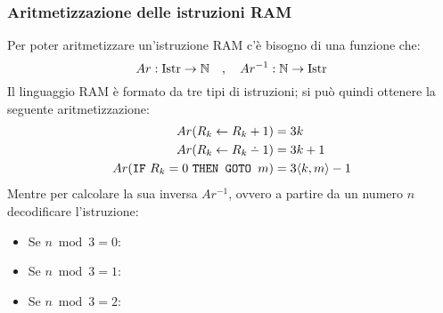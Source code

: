 \subsubsection*{Aritmetizzazione delle istruzioni RAM}
Per poter aritmetizzare un'istruzione RAM c'è bisogno di una funzione che:
$$ Ar:\text{Istr}\to\mathbb{N} \quad , \quad Ar^{-1}:\mathbb{N}\to\text{Istr} $$
Il linguaggio RAM è formato da tre tipi di istruzioni; si può quindi ottenere la
seguente aritmetizzazione:
$$ \begin{aligned}
    Ar(R_k\leftarrow R_k+1) &= 3k\\
    Ar(R_k\leftarrow R_k\dotminus1) &= 3k+1\\
    Ar(\goto{R_k}{m}) &= 3\cantor{k,m}-1
\end{aligned} $$
Mentre per calcolare la sua inversa $Ar^{-1}$, ovvero a partire da un numero $n$ decodificare
l'istruzione:
\begin{itemize}
    \item Se $n\bmod{3}=0$:
    \item Se $n\bmod{3}=1$:
    \item Se $n\bmod{3}=2$:
\end{itemize}

